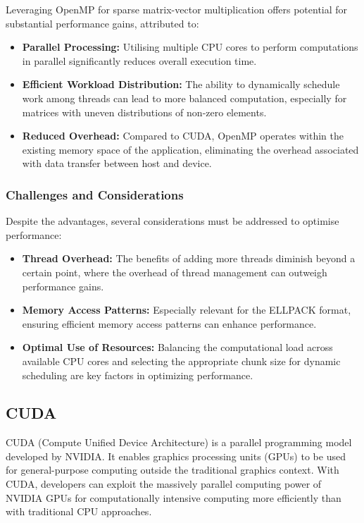 \documentclass[12pt,oneside]{book} %
\begin{document}
Leveraging OpenMP for sparse matrix-vector multiplication offers potential for
substantial performance gains, attributed to:

\begin{itemize}
    \item \textbf{Parallel Processing:}  Utilising multiple CPU cores to perform computations in parallel significantly reduces overall execution time.
    \item \textbf{Efficient Workload Distribution:} The ability to dynamically schedule work among threads can lead to more balanced computation, especially for matrices with uneven distributions of non-zero elements.
    \item \textbf{Reduced Overhead:} Compared to CUDA, OpenMP operates within the existing memory space of the application, eliminating the overhead associated with data transfer between host and device.
\end{itemize}

\subsubsection{Challenges and Considerations}

Despite the advantages, several considerations must be addressed to optimise
performance:

\begin{itemize}
    \item \textbf{Thread Overhead:} The benefits of adding more threads diminish beyond a certain point, where the overhead of thread management can outweigh performance gains.

    \item \textbf{Memory Access Patterns:} Especially relevant for the ELLPACK format, ensuring efficient memory access patterns can enhance performance.

    \item \textbf{Optimal Use of Resources:} Balancing the computational load across available CPU cores and selecting the appropriate chunk size for dynamic scheduling are key factors in optimizing performance.
\end{itemize}

\newpage
\subsection{CUDA}

CUDA (Compute Unified Device Architecture) is a parallel programming model
developed by NVIDIA. It enables graphics processing units (GPUs) to be used for
general-purpose computing outside the traditional graphics context. With CUDA,
developers can exploit the massively parallel computing power of NVIDIA GPUs
for computationally intensive computing more efficiently than with traditional
CPU approaches.
\end{document}
